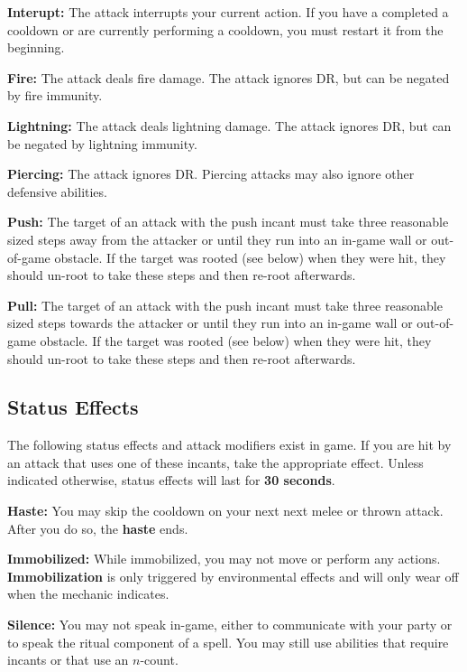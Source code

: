 \documentclass[green]{grimrock}
\begin{document}
{\bf Interupt:} The attack interrupts your current action.  If you have a completed a cooldown or are currently performing a cooldown, you must restart it from the beginning.

{\bf Fire:} The attack deals fire damage.  The attack ignores DR, but can be negated by fire immunity.

{\bf Lightning:} The attack deals lightning damage.  The attack ignores DR, but can be negated by lightning immunity.

{\bf Piercing:} The attack ignores DR.  Piercing attacks may also ignore other defensive abilities.

{\bf Push:} The target of an attack with the push incant must take three reasonable sized steps away from the attacker or until they run into an in-game wall or out-of-game obstacle. If the target was rooted (see below) when they were hit, they should un-root to take these steps and then re-root afterwards.

{\bf Pull:} The target of an attack with the push incant must take three reasonable sized steps towards the attacker or until they run into an in-game wall or out-of-game obstacle. If the target was rooted (see below) when they were hit, they should un-root to take these steps and then re-root afterwards.


\subsection{Status Effects}

The following status effects and attack modifiers exist in game.  If you are hit by an attack that uses one of these incants, take the appropriate effect.  Unless indicated otherwise, status effects will last for {\bf 30 seconds}.



{\bf Haste:} You may skip the cooldown on your next next melee or thrown attack.  After you do so, the {\bf haste} ends.

{\bf Immobilized:}  While immobilized, you may not move or perform any actions.  {\bf Immobilization} is only triggered by environmental effects and will only wear off when the mechanic indicates.

{\bf Silence:} You may not speak in-game, either to communicate with your party or to speak the ritual component of a spell.  You may still use abilities that require incants or that use an $n$-count.
\end{document}
